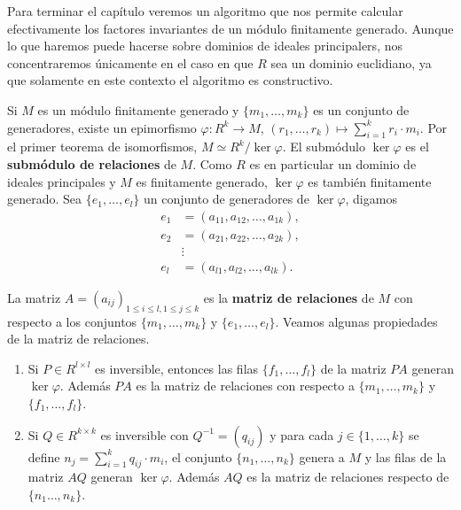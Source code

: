 
Para terminar el capítulo veremos un algoritmo que nos permite calcular
efectivamente los factores invariantes de un módulo finitamente generado. Aunque lo que haremos puede hacerse sobre dominios
de ideales principalers, nos concentraremos únicamente en el caso
en que $R$ sea un dominio euclidiano, ya que solamente en este contexto el algoritmo es constructivo.
 
Si $M$ es un módulo finitamente generado y $\{m_1,\dots,m_k\}$ es
un conjunto de generadores,  
existe un epimorfismo $\varphi\colon R^k\to M$, $(r_1,\dots,r_k)\mapsto \sum_{i=1}^k r_i\cdot m_i$. Por el primer teorema de isomorfismos, 
$M\simeq R^k/\ker\varphi$. 
El submódulo $\ker\varphi$ es el \textbf{submódulo de relaciones} de $M$. 
Como $R$ es en particular un dominio de ideales
principales y $M$ es finitamente generado, $\ker\varphi$ es también finitamente generado. Sea 
$\{e_1,\dots,e_l\}$ un conjunto de generadores de $\ker\varphi$, digamos 
\begin{align*}
e_1&=(a_{11},a_{12},\dots,a_{1k}),\\
e_2&=(a_{21},a_{22},\dots,a_{2k}),\\
&\vdots\\
e_l&=(a_{l1},a_{l2},\dots,a_{lk}).	
\end{align*}

La matriz $A=(a_{ij})_{1\leq i\leq l,1\leq j\leq k}$ es la 
\textbf{matriz de relaciones} de $M$ con respecto a los conjuntos $\{m_1,\dots,m_k\}$ y $\{e_1,\dots,e_l\}$. 
Veamos algunas propiedades de la matriz de relaciones.
\begin{enumerate}
\item Si $P\in R^{l\times l}$ es inversible, entonces las filas $\{f_1,\dots,f_l\}$ de la matriz $PA$ generan $\ker\varphi$. Además $PA$ es la matriz de relaciones
con respecto a $\{m_1,\dots,m_k\}$ y $\{f_1,\dots,f_l\}$. 
\item Si $Q\in R^{k\times k}$ es inversible con 
$Q^{-1}=(q_{ij})$ y para cada
$j\in\{1,\dots,k\}$ se define  
$n_j=\sum_{i=1}^k q_{ij}\cdot m_i$, el conjunto $\{n_1,\dots,n_k\}$ genera a $M$ y las 
filas de la matriz $AQ$ generan $\ker\varphi$. Además $AQ$ es la matriz de relaciones respecto de $\{n_1\dots,n_k\}$.  
\end{enumerate}

